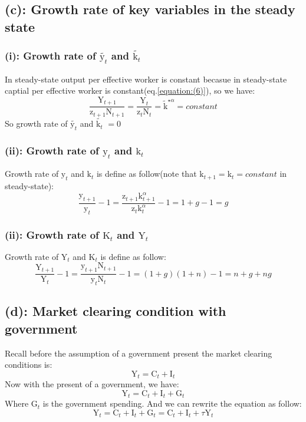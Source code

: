 \documentclass[12pt]{article}
\begin{document}
\subsection*{(c): Growth rate of key variables in the steady state}
\subsubsection*{{(i): Growth rate of $\tilde{\mathrm{y}_t}$ and $\tilde{\mathrm{k}_t}$}}
In steady-state output per effective worker is constant becasue in steady-state captial per effective worker is constant(eq.\ref{equation:(6)}), so we have:
\begin{equation}
    \frac{\mathrm{Y}_{t+1}}{\mathrm{z}_{t+1}\mathrm{N}_{t+1}} = \frac{\mathrm{Y}_t}{\mathrm{z}_t\mathrm{N}_t} = \tilde{\mathrm{k}}^{\star\alpha} = constant
\end{equation}
So growth rate of $\tilde{\mathrm{y}_t}$ and $\tilde{\mathrm{k}_t}$ $= 0 $
\subsubsection*{{(ii): Growth rate of $\mathrm{y}_t$ and $\mathrm{k}_t$}}
Growth rate of $\mathrm{y}_t$ and $\mathrm{k}_t$ is define as follow(note that $\mathrm{k}_{t+1} = \mathrm{k}_{t} = constant $ in steady-state):
\begin{equation}
    \frac{\mathrm{y}_{t+1}}{\mathrm{y}_t} - 1 = \frac{\mathrm{z}_{t+1}\mathrm{k}_{t+1}^{\alpha}}{\mathrm{z}_t\mathrm{k}_t^{\alpha}} - 1  = 1 + g - 1 = g 
\end{equation}
\subsubsection*{{(ii): Growth rate of $\mathrm{K}_t$ and $\mathrm{Y}_t$}}
Growth rate of $\mathrm{Y}_t$ and $\mathrm{K}_t$ is define as follow:
\begin{equation}
    \frac{\mathrm{Y}_{t+1}}{\mathrm{Y}_t} - 1 = \frac{\mathrm{y}_{t+1}\mathrm{N}_{t+1}}{\mathrm{y}_t\mathrm{N}_t} - 1  = (1 + g)(1 + n) - 1 = n + g + ng 
\end{equation}
\subsection*{(d): Market clearing condition with government}
Recall before the assumption of a government present the market clearing conditions is:
\begin{equation}
    \mathrm{Y}_t = \mathrm{C}_t + \mathrm{I}_t
\end{equation}
Now with the present of a government, we have:
\begin{equation}
    \mathrm{Y}_t = \mathrm{C}_t + \mathrm{I}_t + \mathrm{G}_t
\end{equation}
Where $\mathrm{G}_t$ is the government spending. And we can rewrite the equation as follow:
\begin{equation}
    \mathrm{Y}_t = \mathrm{C}_t + \mathrm{I}_t + \mathrm{G}_t = \mathrm{C}_t + \mathrm{I}_t + \tau\mathrm{Y}_t
\end{equation}
\end{document}
